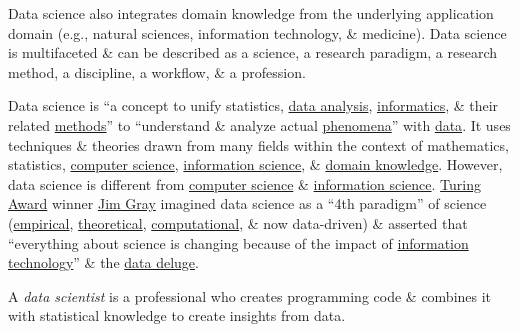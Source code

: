 \documentclass{article}
\begin{document}
Data science also integrates domain knowledge from the underlying application domain (e.g., natural sciences, information technology, \& medicine). Data science is multifaceted \& can be described as a science, a research paradigm, a research method, a discipline, a workflow, \& a profession.

Data science is ``a concept to unify statistics, \href{https://en.wikipedia.org/wiki/Data_analysis}{data analysis}, \href{https://en.wikipedia.org/wiki/Informatics}{informatics}, \& their related \href{https://en.wikipedia.org/wiki/Scientific_method}{methods}'' to ``understand \& analyze actual \href{https://en.wikipedia.org/wiki/Phenomena}{phenomena}'' with \href{https://en.wikipedia.org/wiki/Data}{data}. It uses techniques \& theories drawn from many fields within the context of mathematics, statistics, \href{https://en.wikipedia.org/wiki/Computer_science}{computer science}, \href{https://en.wikipedia.org/wiki/Information_science}{information science}, \& \href{https://en.wikipedia.org/wiki/Domain_knowledge}{domain knowledge}. However, data science is different from \href{https://en.wikipedia.org/wiki/Computer_science}{computer science} \& \href{https://en.wikipedia.org/wiki/Information_science}{information science}. \href{https://en.wikipedia.org/wiki/Turing_Award}{Turing Award} winner \href{https://en.wikipedia.org/wiki/Jim_Gray_(computer_scientist)}{Jim Gray} imagined data science as a ``4th paradigm'' of science (\href{https://en.wikipedia.org/wiki/Empirical_research}{empirical}, \href{https://en.wikipedia.org/wiki/Basic_research}{theoretical}, \href{https://en.wikipedia.org/wiki/Computational_science}{computational}, \& now data-driven) \& asserted that ``everything about science is changing because of the impact of \href{https://en.wikipedia.org/wiki/Information_technology}{information technology}'' \& the \href{https://en.wikipedia.org/wiki/Information_explosion}{data deluge}.

A {\it data scientist} is a professional who creates programming code \& combines it with statistical knowledge to create insights from data.
\end{document}
